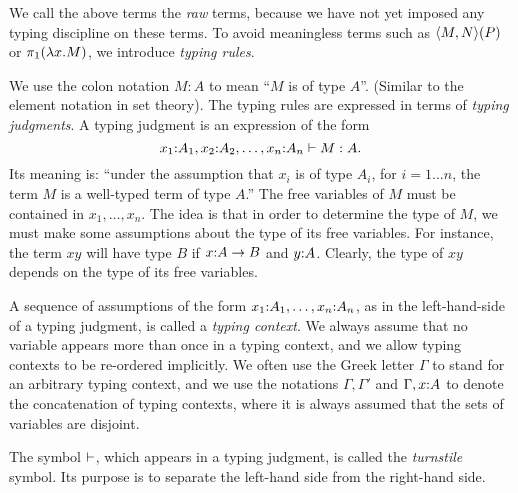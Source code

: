 \documentclass{article}
\begin{document}
We call the above terms the {\em raw} terms, because we have not yet
imposed any typing discipline on these terms. To avoid meaningless
terms such as $\langle M,N\rangle(P)$ or $\pi_1(\lambda x.M)$, we introduce {\em
  typing rules}. 

We use the colon notation $M:A$ to mean ``$M$ is of type $A$''.
(Similar to the element notation in set theory).  The typing rules are
expressed in terms of {\em typing judgments}. A typing judgment is an
expression of the form
\[  x_1{:}A_1,x_2{:}A_2,\ldots,x_n{:}A_n \vdash M:A.
\]
Its meaning is: ``under the assumption that $x_i$ is of type $A_i$,
for $i=1\ldots n$, the term $M$ is a well-typed term of type $A$.'' 
The free variables of $M$ must be contained in $x_1,\ldots,x_n$. The
idea is that in order to determine the type of $M$, we must make some
assumptions about the type of its free variables. For instance, the
term $xy$ will have type $B$ if $x{:}A\to B$ and $y{:}A$. 
Clearly, the type of $xy$ depends on the type of its free variables. 

A sequence of assumptions of the form
$x_1{:}A_1,\ldots,x_n{:}A_n$, as in the left-hand-side of a
typing judgment, is called a {\em typing context}. We always assume
that no variable appears more than once in a typing context, and we
allow typing contexts to be re-ordered implicitly. We often use the
Greek letter $\Gamma$ to stand for an arbitrary typing context, and we
use the notations $\Gamma,\Gamma'$ and $\Gamma,x{:}A$ to denote
the concatenation of typing contexts, where it is always assumed that
the sets of variables are disjoint.

The symbol $\vdash$, which appears in a typing judgment, is called the
{\em turnstile} symbol. Its purpose is to separate the left-hand side
from the right-hand side. 
\end{document}
